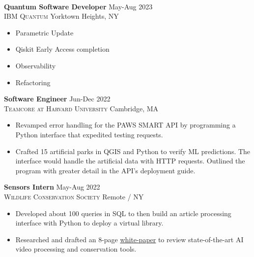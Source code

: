 \documentclass[11pt]{article}
\begin{document}
  \vspace{-8pt}\\
  \noindent\makebox[\linewidth]{\rule{7.5in}{0.3pt}}

    \noindent \textbf{Quantum Software Developer} \hfill May-Aug 2023\\
    \textsc{IBM Quantum}  \hfill Yorktown Heights, NY
    \begin{itemize}[itemsep=-.4em, leftmargin=1em]\vspace{-2mm}
      \item Parametric Update
      \item Qiskit Early Access completion
      \item Observability
      \item Refactoring
    \end{itemize}

    \noindent \textbf{Software Engineer} \hfill Jun-Dec 2022 \\
    \textsc{Teamcore at Harvard University} \hfill Cambridge, MA
    \begin{itemize}[itemsep=-.4em, leftmargin=1em]\vspace{-2mm}
      \item Revamped error handling for the PAWS SMART API by programming a Python interface that expedited testing requests. 
      \item Crafted 15 artificial parks in QGIS and Python to verify ML predictions. The interface would handle the artificial data with HTTP requests. Outlined the program with greater detail in the API's deployment guide.
    \end{itemize}

    \noindent \textbf{Sensors Intern} \hfill May-Aug 2022\\
    \textsc{{Wildlife Conservation Society}} \hfill Remote / NY
    \begin{itemize}[itemsep=-.4em, leftmargin=1em]\vspace{-2mm}
      \item Developed about 100 queries in SQL to then build an article processing interface with Python to deploy a virtual library.
      \item Researched and drafted an 8-page
      \href{https://bit.ly/AI-Advancing-Video-Processing-and-CTDS}{white-paper} to review state-of-the-art AI video processing and conservation tools.
    \end{itemize}
  \vspace{.5mm}
  
\end{document}
